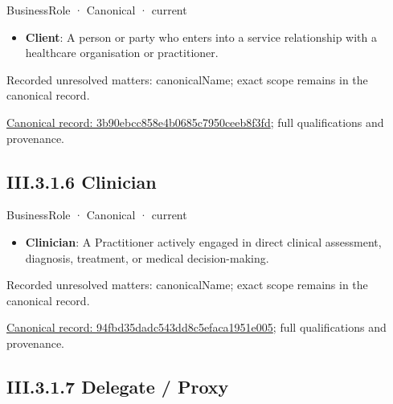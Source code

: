 \label{element:3b90ebcc858e4b0685c7950ceeb8f3fd}
{\small BusinessRole · Canonical · current}\par

\begin{itemize}


\item \textbf{Client}: A person or party who enters into a service relationship with a healthcare organisation or practitioner.

\end{itemize}

{\small Recorded unresolved matters: canonicalName; exact scope remains in the canonical record.}\par
{\footnotesize \href{../../../../../../../continuum/business/business-role/3b90ebcc858e4b0685c7950ceeb8f3fd.md}{Canonical record: 3b90ebcc858e4b0685c7950ceeb8f3fd}; full qualifications and provenance.}\par
\subsection*{III.3.1.6 Clinician}
\label{navigation:III.3.1.6}

\label{element:94fbd35dadc543dd8c5efaca1951e005}
{\small BusinessRole · Canonical · current}\par

\begin{itemize}


\item \textbf{Clinician}: A Practitioner actively engaged in direct clinical assessment, diagnosis, treatment, or medical decision-making.

\end{itemize}

{\small Recorded unresolved matters: canonicalName; exact scope remains in the canonical record.}\par
{\footnotesize \href{../../../../../../../continuum/business/business-role/94fbd35dadc543dd8c5efaca1951e005.md}{Canonical record: 94fbd35dadc543dd8c5efaca1951e005}; full qualifications and provenance.}\par
\subsection*{III.3.1.7 Delegate / Proxy}
\label{navigation:III.3.1.7}

